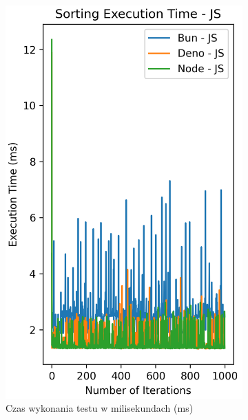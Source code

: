 \begin{figure}[H]
  \centering
  \begin{subfigure}[b]{0.4\textwidth}
    \centering
    \includegraphics[width=\textwidth]{Figures/sorting/sorting_radix_1000_10000_js_time.png}
    \caption{Czas wykonania testu w milisekundach (ms)}
    \label{fig:radix_sorting_e4_time}
  \end{subfigure}
  \begin{subfigure}[b]{0.4\textwidth}
    \centering

\end{subfigure}
\end{figure}
